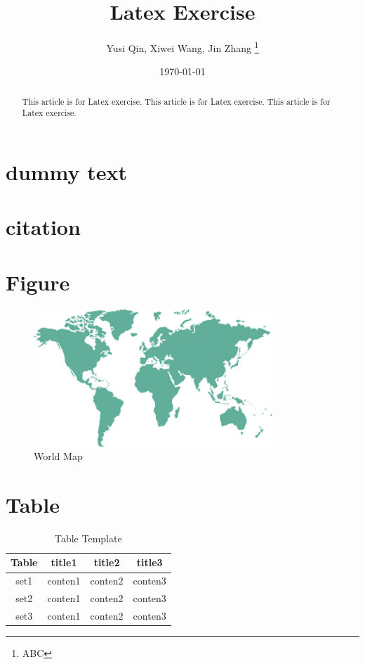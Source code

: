 \documentclass{article}
\title{Latex Exercise} %
\author{Yusi Qin, Xiwei Wang, Jin Zhang \thanks{ABC}}
\affil{University of Zurich}
\date{\today}
\begin{document}
\maketitle
\begin{abstract}
This article is for Latex exercise. This article is for Latex exercise. This article is for Latex exercise.
\end{abstract}

\newpage
\section{dummy text}
\blindtext[8]

\newpage
\section{citation}
%
\cite{JKLVVV}

\cite{NJGRSJK}

\newpage
\section{Figure}

\begin{figure}[H]
\centering
\includegraphics[width=0.8\textwidth]{worldmap.png}
\caption{World Map}
\end{figure}

\newpage
\section{Table}

\begin{table}[H]
\centering
\begin{tabular}{|c|c|c|c|}
\hline
Table&title1&title2&title3\\ 
\hline
set1&conten1&conten2&conten3\\ 
\hline 
set2&conten1&conten2&conten3\\ 
\hline 
set3&conten1&conten2&conten3\\
\hline
\end{tabular}
\caption{Table Template}
\end{table}


\newpage

 
\end{document}

